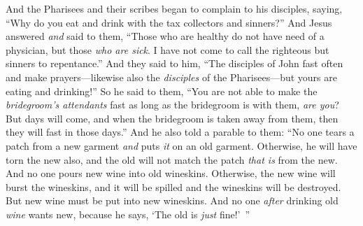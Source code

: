 \begin{biblechapter}
\verse And the Pharisees and their scribes began to complain to his disciples, saying, “Why do you eat and drink with the tax collectors and sinners?”
\verse And Jesus answered \textit{and} said to them, “Those who are healthy do not have need of a physician, but those \textit{who are sick}.
\verse I have not come to call the righteous but sinners to repentance.”
 And they said to him, “The disciples of John fast often and make prayers—likewise also the \textit{disciples} of the Pharisees—but yours are eating and drinking!”
\verse So he said to them, “You are not able to make the \textit{bridegroom’s attendants} fast as long as the bridegroom is with them, \textit{are you}?
\verse But days will come, and when the bridegroom is taken away from them, then they will fast in those days.”
\verse And he also told a parable to them: “No one tears a patch from a new garment \textit{and} puts \textit{it} on an old garment. Otherwise, he will have torn the new also, and the old will not match the patch \textit{that is} from the new.
\verse And no one pours new wine into old wineskins. Otherwise, the new wine will burst the wineskins, and it will be spilled and the wineskins will be destroyed.
\verse But new wine must be put into new wineskins.
\verse And no one \textit{after} drinking old \textit{wine} wants new, because he says, ‘The old is \textit{just} fine!’ ”
\end{biblechapter}

